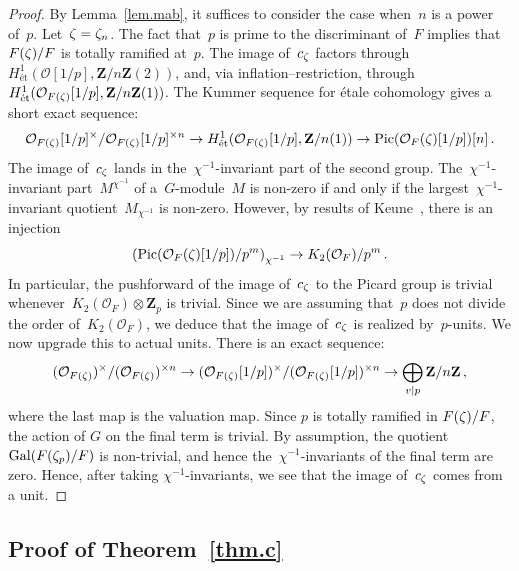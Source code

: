 \documentclass[12pt,reqno]{amsart}
\theoremstyle{definition}
\def\Z{\mathbf Z}   %
\def\nn{n}
\def\ll{m}
\def\Pic{\mathrm{Pic}}
\def\et{\text{\'{e}t}}
\def\Gal{\mathrm{Gal}}
\def\OL{\mathcal{O}}
\begin{document}
\begin{proof}
By Lemma~\ref{lem.mab}, it suffices to consider the case when~$\nn$ 
is a power of~$p$. Let~$\z = \z_\nn$.
The fact that~$p$ is prime to the discriminant of~$F$ 
implies that~$F(\zeta)/F$ is totally ramified at~$p$.
The image of~$c_{\zeta}$ factors 
through~$H^1_{\et}(\OL[1/p],\Z/\nn\Z(2))$, and, via inflation--restriction,
through~$H^1_{\et}(\OL_{F(\z)}[1/p],\Z/\nn\Z(1))$.
 The Kummer sequence for \'etale cohomology gives 
a short exact sequence:
$$
\OL_{F(\z)}[1/p]^{\times}/\OL_{F(\z)}[1/p]^{\times \nn}
\rightarrow   H^1_{\et}(\OL_{F(\z)}[1/p],\Z/\nn(1))
\rightarrow \Pic(\OL_F(\z)[1/p])[\nn]\,.
$$
The image of~$c_{\zeta}$ lands in the~$\chi^{-1}$-invariant part of the 
second group.
The~$\chi^{-1}$-invariant part~$M^{\chi^{-1}}$ of a~$G$-module~$M$
is non-zero if and only if the largest~$\chi^{-1}$-invariant 
quotient~$M_{\chi^{-1}}$ is non-zero. However,
by results of Keune~\cite{Keune}, there is an injection
$$
\left(\Pic(\OL_F(\z)[1/p])/p^{\ll} \right)_{\chi^{-1}} 
\rightarrow K_2(\OL_F)/p^{\ll} \,.
$$
In particular, the pushforward of the  image of~$c_{\zeta}$ to the Picard group
is trivial whenever~$K_2(\OL_F) \otimes \Z_p$ is trivial.
Since we are assuming that~$p$ does not divide the order of~$K_2(\OL_F)$,
we deduce that the image of~$c_{\zeta}$ is realized by~$p$-units.
We now upgrade this to actual units.
There is an exact sequence:
$$
(\OL_{F(\z)})^{\times}/ (\OL_{F(\z)})^{\times \nn} \rightarrow 
(\OL_{F(\z)}[1/p])^{\times}/(\OL_{F(\z)}[1/p])^{\times \nn} 
\rightarrow \bigoplus_{v|p} \Z/\nn \Z\,,
$$
where the last map is the valuation map. Since $p$ is totally ramified in 
$F(\zeta)/F$,  the action of $G$ on the final term is trivial. 
By assumption, the quotient~$\Gal(F(\z_p)/F)$ is non-trivial, and 
hence the~$\chi^{-1}$-invariants of the final term are zero.
Hence, after taking 
$\chi^{-1}$-invariants, we see that the image of~$c_\zeta$ comes from a unit.
\end{proof}

\subsection{Proof of Theorem~\ref{thm.c}}
\label{sub.thm.c}
\end{document}
